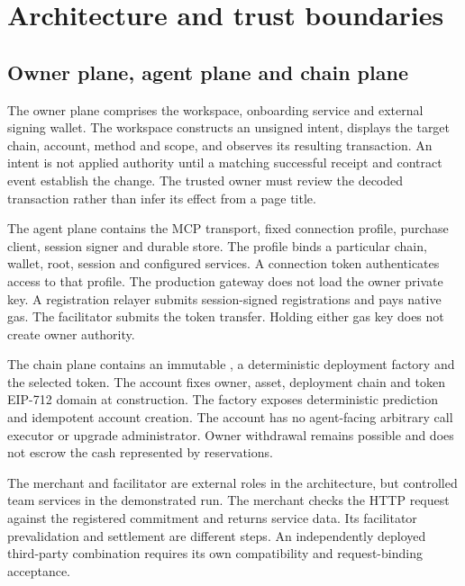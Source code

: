 \section{Architecture and trust boundaries}\label{sec:architecture}

\subsection{Owner plane, agent plane and chain plane}
The owner plane comprises the workspace, onboarding service and external signing wallet. The workspace constructs an unsigned intent, displays the target chain, account, method and scope, and observes its resulting transaction. An intent is not applied authority until a matching successful receipt and contract event establish the change. The trusted owner must review the decoded transaction rather than infer its effect from a page title.

The agent plane contains the MCP transport, fixed connection profile, purchase client, session signer and durable store. The profile binds a particular chain, wallet, root, session and configured services. A connection token authenticates access to that profile. The production gateway does not load the owner private key. A registration relayer submits session-signed registrations and pays native gas. The facilitator submits the token transfer. Holding either gas key does not create owner authority.\sourcecite

The chain plane contains an immutable , a deterministic deployment factory and the selected token. The account fixes owner, asset, deployment chain and token EIP-712 domain at construction. The factory exposes deterministic prediction and idempotent account creation. The account has no agent-facing arbitrary call executor or upgrade administrator. Owner withdrawal remains possible and does not escrow the cash represented by reservations.

The merchant and facilitator are external roles in the architecture, but controlled team services in the demonstrated run. The merchant checks the HTTP request against the registered commitment and returns service data. Its facilitator prevalidation and settlement are different steps. An independently deployed third-party combination requires its own compatibility and request-binding acceptance.

